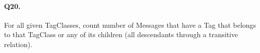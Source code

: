 \paragraph{Q20.}

For all given TagClasses, count number of Messages that have a Tag that
belongs to that TagClass or any of its children (all descendants through
a transitive relation).

